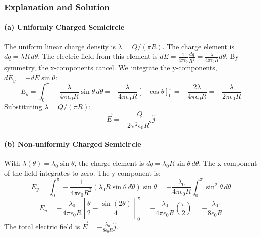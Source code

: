 \documentclass{article}
\begin{document}
\begin{center}
\end{center}

\subsubsection*{Explanation and Solution}
\paragraph{(a) Uniformly Charged Semicircle}
The uniform linear charge density is $\lambda = Q/(\pi R)$. The charge element is $dq = \lambda R \, d\theta$.
The electric field from this element is $dE = \frac{1}{4\pi\epsilon_0}\frac{dq}{R^2} = \frac{\lambda}{4\pi\epsilon_0 R} d\theta$.
By symmetry, the x-components cancel. We integrate the y-components, $dE_y = -dE \sin\theta$:
$$ E_y = \int_0^\pi -\frac{\lambda}{4\pi\epsilon_0 R} \sin\theta \, d\theta = -\frac{\lambda}{4\pi\epsilon_0 R} [-\cos\theta]_0^\pi = -\frac{2\lambda}{4\pi\epsilon_0 R} = -\frac{\lambda}{2\pi\epsilon_0 R} $$
Substituting $\lambda = Q/(\pi R)$:
$$ \vec{E} = -\frac{Q}{2\pi^2\epsilon_0 R^2} \hat{j} $$

\paragraph{(b) Non-uniformly Charged Semicircle}
With $\lambda(\theta) = \lambda_0 \sin\theta$, the charge element is $dq = \lambda_0 R \sin\theta \, d\theta$.
The x-component of the field integrates to zero. The y-component is:
$$ E_y = \int_0^\pi -\frac{1}{4\pi\epsilon_0 R^2} (\lambda_0 R \sin\theta \, d\theta) \sin\theta = -\frac{\lambda_0}{4\pi\epsilon_0 R} \int_0^\pi \sin^2\theta \, d\theta $$
$$ E_y = -\frac{\lambda_0}{4\pi\epsilon_0 R} \left[ \frac{\theta}{2} - \frac{\sin(2\theta)}{4} \right]_0^\pi = -\frac{\lambda_0}{4\pi\epsilon_0 R} \left( \frac{\pi}{2} \right) = -\frac{\lambda_0}{8\epsilon_0 R} $$
The total electric field is $\vec{E} = -\frac{\lambda_0}{8\epsilon_0 R} \hat{j}$.
\end{document}
